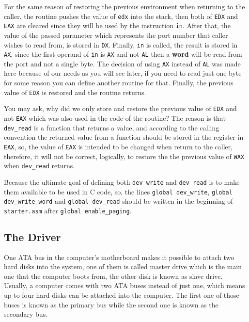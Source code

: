 For the same reason of restoring the previous environment when returning
to the caller, the routine pushes the value of \lstinline!edx! into the
stack, then both of \lstinline!EDX! and \lstinline!EAX! are cleared
since they will be used by the instruction \lstinline!in!. After that,
the value of the passed parameter which represents the port number that
caller wishes to read from, is stored in \lstinline!DX!. Finally,
\lstinline!in! is called, the result is stored in \lstinline!AX!, since
the first operand of \lstinline!in! is \lstinline!AX! and not
\lstinline!AL! then a \textbf{word} will be read from the port and not a
single byte. The decision of using \lstinline!AX! instead of
\lstinline!AL! was made here because of our needs as you will see later,
if you need to read just one byte for some reason you can define another
routine for that. Finally, the previous value of \lstinline!EDX! is
restored and the routine returns.

You may ask, why did we only store and restore the previous value of
\lstinline!EDX! and not \lstinline!EAX! which was also used in the code
of the routine? The reason is that \lstinline!dev_read! is a function
that returns a value, and according to the calling convention the
returned value from a function should be stored in the register in
\lstinline!EAX!, so, the value of \lstinline!EAX! is intended to be
changed when return to the caller, therefore, it will not be correct,
logically, to restore the the previous value of \lstinline!WAX! when
\lstinline!dev_read! returns.

Because the ultimate goal of defining both \lstinline!dev_write! and
\lstinline!dev_read! is to make them available to be used in C code, so,
the lines \lstinline!global dev_write!,
\lstinline!global dev_write_word! and \lstinline!global dev_read! should
be written in the beginning of \lstinline!starter.asm! after
\lstinline!global enable_paging!.

\subsection{The Driver}\label{the-driver}

One ATA bus in the computer's motherboard makes it possible to attach
two hard disks into the system, one of them is called master drive which
is the main one that the computer boots from, the other disk is known as
slave drive. Usually, a computer comes with two ATA buses instead of
just one, which means up to four hard disks can be attached into the
computer. The first one of those buses is known as the primary bus while
the second one is known as the secondary bus.

